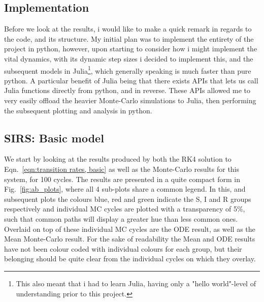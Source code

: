 \documentclass[10pt,showpacs,preprintnumbers,amsmath,amssymb,nofootinbib,aps,prl,twocolumn,groupedaddress,superscriptaddress,showkeys]{revtex4-1}
\begin{document}
  \subsection{Implementation}
    Before we look at the results, i would like to make a quick remark in regards to the code, and its structure. My initial plan was to implement the entirety of the project in python, however, upon starting to consider how i might implement the vital dynamics, with its dynamic step sizes i decided to implement this, and the subsequent models in Julia\footnote{This also meant that i had to learn Julia, having only a "hello world"-level of understanding prior to this project.}, which generally speaking is much faster than pure python. A particular benefit of Julia being that there exists APIs that lets us call Julia functions directly from python, and in reverse. These APIs allowed me to very easily offload the heavier Monte-Carlo simulations to Julia, then performing the subsequent plotting and analysis in python. 

  \subsection{SIRS: Basic model}
    We start by looking at the results produced by both the RK4 solution to Eqn.~\ref{eqn:transition rates, basic} as well as the Monte-Carlo results for this system, for 100 cycles. The results are presented in a quite compact form in Fig.~\ref{fig:ab_plots}, where all 4 sub-plots share a common legend. In this, and subsequent plots the colours blue, red and green indicate the S, I and R groups respectively and individual MC cycles are plotted with a transparency of 5\%, such that common paths will display a greater hue than less common ones. Overlaid on top of these individual MC cycles are the ODE result, as well as the Mean Monte-Carlo result. For the sake of readability the Mean and ODE results have not been colour coded with individual colours for each group, but their belonging should be quite clear from the individual cycles on which they overlay.
\end{document}
